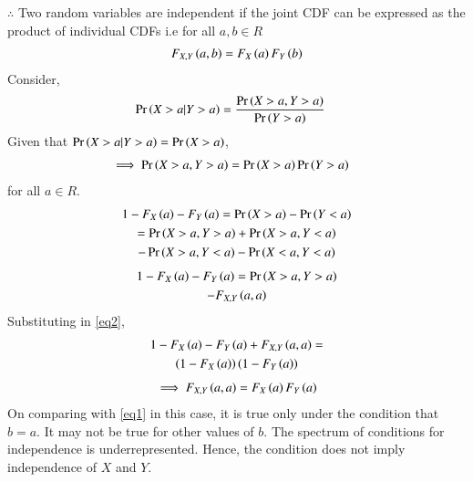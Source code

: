 \documentclass[journal,12pt,twocolumn]{IEEEtran}
\begin{document}
\begin{enumerate}
    $\therefore$ Two random variables are independent if the joint CDF can be expressed as the product of individual CDFs i.e for all $a,b\in R$
    \begin{align}
       \label{eq1} F_{X,Y}\left(a,b\right)=F_X\left(a\right)F_Y\left(b\right)
    \end{align}
    Consider,
    \begin{align}
      \Pr\left(X>a|Y>a\right)&=\frac{\Pr\left(X>a,Y>a\right)}{\Pr\left(Y>a\right)}
    \end{align}
    Given that $\Pr\left(X>a|Y>a\right)=\Pr\left(X>a\right)$,
    \begin{align}
        \label{eq2}\implies \Pr\left(X>a,Y>a\right)&=\Pr\left(X>a\right)\Pr\left(Y>a\right)
    \end{align}
    for all $a\in R$.
    \begin{multline}
        1-F_X\left(a\right)-F_Y\left(a\right)=\Pr\left(X>a\right)-\Pr\left(Y<a\right)\\=\Pr\left(X>a,Y>a\right)+\Pr\left(X>a,Y<a\right)\\-\Pr\left(X>a,Y<a\right)-\Pr\left(X<a,Y<a\right)
    \end{multline}
    \begin{multline}
        1-F_X\left(a\right)-F_Y\left(a\right)=\Pr\left(X>a,Y>a\right)\\-F_{X,Y}\left(a,a\right)
    \end{multline}
    Substituting in \eqref{eq2},
    \begin{multline}
        1-F_X\left(a\right)-F_Y\left(a\right)+F_{X,Y}\left(a,a\right)=\\ \left(1-F_X\left(a\right)\right)\left(1-F_Y\left(a\right)\right)
    \end{multline}
    \begin{align}
        \implies F_{X,Y}\left(a,a\right)=F_X\left(a\right)F_Y\left(a\right)
    \end{align}
    On comparing with \eqref{eq1} in this case, it is true only under the condition that $b=a$. It may not be true for other values of $b$. The spectrum of conditions for independence is underrepresented. Hence, the condition does not imply independence of $X$ and $Y$.
    

\end{enumerate}
\end{document}
